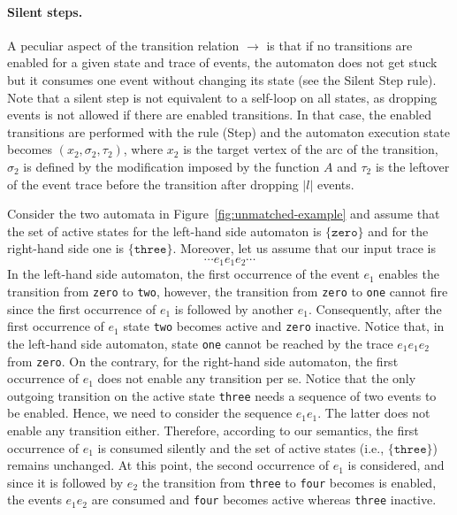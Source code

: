 \documentclass{llncs} %
\begin{document}
\paragraph{Silent steps.}
A peculiar aspect of the transition relation $\to$ is that if no transitions are enabled for a given
state and trace of events, the automaton does not get stuck but it
consumes one event without changing its state (see the  Silent Step rule). Note that
a silent step is not equivalent to a self-loop on all states, as
dropping events is not allowed if there are enabled
transitions. In that case,  the enabled transitions are performed 
with the rule (Step) and
the automaton execution state becomes $(x_2, \sigma_2,\tau_2)$, where $x_2$ is the target vertex of
the arc of the transition, $\sigma_2$ is defined by the modification imposed by the function $A$ and
$\tau_2$ is the leftover of the event trace before the transition after dropping
$|l|$ events.
\begin{example}
Consider the two automata in Figure~\ref{fig:unmatched-example} and assume that the set of active states for the left-hand side automaton is $\{ \texttt{zero} \}$ and for the right-hand side one is $\{ \texttt{three}\}$. Moreover, let us assume that our input trace is 
\[
\cdots e_1 e_1 e_2 \cdots
\] In the left-hand side automaton, the first occurrence of the event $e_1$ enables the transition  from {\tt zero} to {\tt two}, however, the transition from {\tt zero} to {\tt one} cannot fire since the first occurrence of $e_1$ is followed by another $e_1$.
Consequently, after the first occurrence of $e_1$ state {\tt two} becomes active and {\tt zero} inactive. 
Notice that, in the left-hand side automaton, state {\tt one} cannot be reached by 
the trace $e_1 e_1 e_2 $ from {\tt zero}. 
On the contrary, for the right-hand side automaton, the first occurrence of $e_1$ does not enable any transition per se. 
Notice that the only outgoing transition on the active state {\tt three} needs a sequence of two events to be enabled. Hence, we need to consider the sequence $e_1e_1$. The latter does not enable any transition either. Therefore, according to our semantics,  the first occurrence of $e_1$ is consumed silently and the set of active states (i.e., $\{ \texttt{three} \}$) remains unchanged. At this point, the second occurrence of $e_1$ is considered, and since it is followed by $e_2$ the transition from {\tt three} to {\tt four} becomes is enabled, the events $e_1e_2$ are consumed and {\tt four} becomes active whereas {\tt three} inactive.
\end{example}
\end{document}
